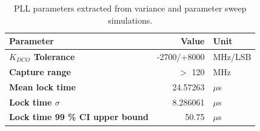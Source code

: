 \begin{table}[h!]
	\centering
	\def\arraystretch{1.5}		
	\setlength\arrayrulewidth{0.75pt}
	\setlength{\tabcolsep}{1em} %
	\begin{tabular}{|l|r|l|}
		\hline 
		\rule[-1ex]{0pt}{2.5ex} \cellcolor{gray!40}\textbf{Parameter} & \cellcolor{gray!40}\textbf{Value} & \cellcolor{gray!40}\textbf{Unit }\\ 
		\hline 
		\rule[-1ex]{0pt}{2.5ex} \textbf{$K_{DCO}$ Tolerance}  & -2700/+8000 & MHz/LSB \\ 
		\hline 
		\rule[-1ex]{0pt}{2.5ex} \textbf{Capture range}  & $>$ 120 & MHz \\ 
		\hline 
		\rule[-1ex]{0pt}{2.5ex} \textbf{Mean lock time}  & 24.57263 & $\mu$s \\ 
		\hline 
		\rule[-1ex]{0pt}{2.5ex} \textbf{Lock time $\sigma$} & 8.286061 & $\mu$s\\ 
		\hline 
		\rule[-1ex]{0pt}{2.5ex} \textbf{Lock time 99 \% CI upper bound} & 50.75  & $\mu$s\\ 
		\hline 
	\end{tabular} 
	\caption{PLL parameters extracted from variance and parameter sweep simulations.}
	\label{simulation_params}
\end{table}

